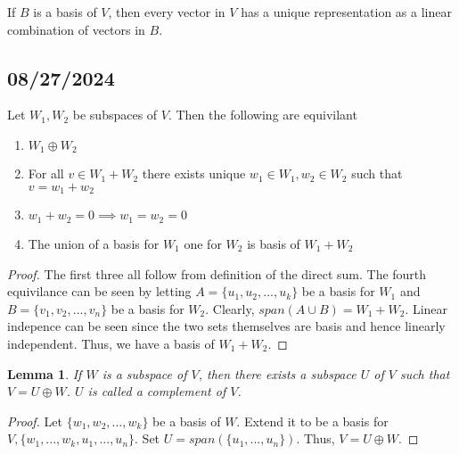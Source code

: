 \documentclass{tufte-handout}
\newtheorem{lem}[thm]{Lemma}
\theoremstyle{definition}
\theoremstyle{remark}
\begin{document}
If $B$ is a basis of $V$, then every vector in $V$ has a unique representation as a linear combination of vectors in $B$. 

\subsection{08/27/2024}
Let $W_1, W_2$ be subspaces of $V$. Then the following are equivilant 
\begin{enumerate}
\item $W_1 \oplus W_2$
\item For all $v\in W_1 + W_2$ there exists unique $w_1 \in W_1, w_2 \in W_2$ such that $v = w_1 + w_2$
\item $w_1 + w_2 = 0 \implies w_1 = w_2 = 0$
\item The union of a basis for $W_1$ one for $W_2$ is basis of $W_1 + W_2$
\end{enumerate}

\begin{proof}
The first three all follow from definition of the direct sum. The fourth equivilance can be seen by letting $A = \{u_1, u_2, ..., u_k\}$ be a basis for $W_1$ and $B = \{v_1, v_2, ..., v_n\}$ be a basis for $W_2$. Clearly, $span(A\cup B) = W_1+W_2$. Linear indepence can be seen since the two sets themselves are basis and hence linearly independent. Thus, we have a basis of $W_1 + W_2$. 
\end{proof}

\begin{lem}
If $W$ is a subspace of $V$, then there exists a subspace $U$ of $V$ such that $V = U \oplus W$. $U$ is called a complement of $V$. 
\end{lem}
\begin{proof}
Let $\{w_1, w_2, ..., w_k\}$ be a basis of $W$. Extend it to be a basis for $V, \{w_1, ..., w_k, u_1, ..., u_n\}$. Set $U = span(\{u_1, ..., u_n\})$. Thus, $V = U \oplus W$.
\end{proof}
\end{document}
